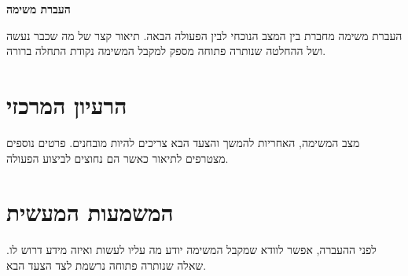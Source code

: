 \def\lakitdocumentclass{article}
\def\lakitclassoptions{11pt,a4paper}
\def\lakitgeometryoptions{margin=2.2cm,headheight=14pt}
\def\lakitlinespread{1.18}
\def\lakitparagraphstyle{block}




{\LARGE\sffamily\bfseries\noindent העברת משימה\par}\medskip
העברת משימה מחברת בין המצב הנוכחי לבין הפעולה הבאה. תיאור קצר של מה שכבר
נעשה ושל ההחלטה שנותרה פתוחה מספק למקבל המשימה נקודת התחלה ברורה.
\section{הרעיון המרכזי}
מצב המשימה, האחריות להמשך והצעד הבא צריכים להיות מובחנים. פרטים נוספים
מצטרפים לתיאור כאשר הם נחוצים לביצוע הפעולה.
\section{המשמעות המעשית}
לפני ההעברה, אפשר לוודא שמקבל המשימה יודע מה עליו לעשות ואיזה מידע דרוש
לו. שאלה שנותרה פתוחה נרשמת לצד הצעד הבא.

